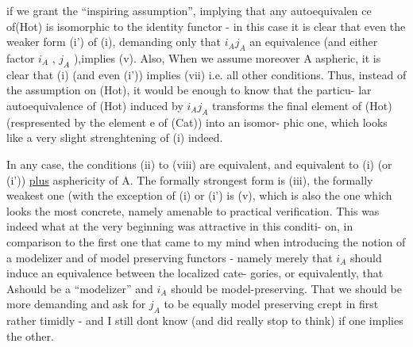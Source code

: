 
if we grant the ``inspiring assumption'', implying that any autoequivalen
ce of(Hot)  is isomorphic to the identity functor  -  in this case it is
clear that even the weaker form (i')  of (i),  demanding only that
$i_Aj_A$   an equivalence  (and   either factor $i_A$ , $j_A$ ),implies (v).
Also,  When we assume moreover A aspheric, it is clear that (i)
(and even (i')) implies (vii) i.e. all other conditions.  Thus,  instead 
of the assumption  on (Hot),  it would be enough to know that the particu-%
lar autoequivalence  of (Hot) induced by $i_Aj_A$  transforms the final
element of (Hot)  (respresented by the element e of (Cat)) into an isomor-%
phic one, which looks like a very slight strenghtening of (i) indeed.

In any case,  the conditions (ii) to (viii) are equivalent,  and
equivalent to  (i)  (or (i'))  \uline{plus} asphericity of A.  The formally
strongest form is (iii),  the formally weakest one (with the exception
of (i) or (i')\hand{)}  is (v),  which is also the one
which looks the most concrete,  namely amenable to practical verification.
This was indeed what at the very beginning was attractive in this conditi-%
on,  in comparison to the first one that came to my mind when introducing
the notion of a modelizer and of model preserving functors  -  namely 
merely that  $i_A$  should induce an equivalence between the localized cate-%
gories,  or equivalently,  that A\hand{$\hat{}$}should be a ``modelizer'' and $i_A$ should
be model-preserving.  That we should be more demanding and ask for $j_A$ to
be equally model preserving crept in first rather timidly  -  and I still
dont know (and did really stop to think)  if  one implies the other\deleted{\unsure{(***)}}.

